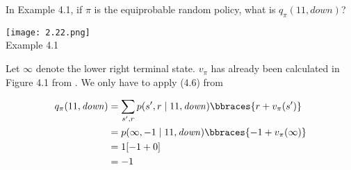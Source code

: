 
\begin{exercise}[Exercise 4.1]

In Example 4.1, if $\pi$ is the equiprobable random policy, what is $q_\pi(11, \mathit{down})$?

\begin{center}
    \texttt{[image: 2.22.png]} \\
    Example 4.1
\end{center}

\end{exercise}


\begin{solution}

Let $\infty$ denote the lower right terminal state.
$v_\pi$ has already been calculated in Figure 4.1 from \cite*[page 77]{SuttonRichardS2018Rl:a}.
We only have to apply (4.6) from \cite*[page 78]{SuttonRichardS2018Rl:a}

\begin{align*}
    q_\pi(11, \mathit{down})
    & =
    \sum_{s^\prime, r}
        p(s^\prime, r \mid 11, \mathit{down})
        \bbraces{r + v_\pi(s^\prime)} \\
    & =
    p(\infty, -1 \mid 11, \mathit{down})
    \bbraces{-1 + v_\pi(\infty)} \\
    & =
    1 [-1 + 0] \\
    & =
    -1
\end{align*}

\end{solution}

